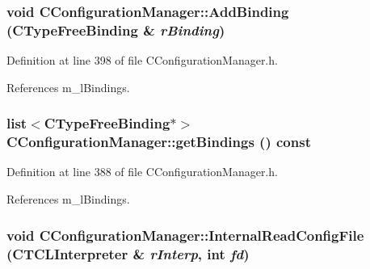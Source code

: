 \subsubsection{\setlength{\rightskip}{0pt plus 5cm}void CConfiguration\-Manager::Add\-Binding ({\bf CType\-Free\-Binding} \& {\em r\-Binding})\hspace{0.3cm}{\tt  [inline]}}\label{classCConfigurationManager_a9}




Definition at line 398 of file CConfiguration\-Manager.h.

References m\_\-l\-Bindings.
\subsubsection{\setlength{\rightskip}{0pt plus 5cm}list$<${\bf CType\-Free\-Binding}$\ast$$>$ CConfiguration\-Manager::get\-Bindings () const\hspace{0.3cm}{\tt  [inline]}}\label{classCConfigurationManager_a7}




Definition at line 388 of file CConfiguration\-Manager.h.

References m\_\-l\-Bindings.
\subsubsection{\setlength{\rightskip}{0pt plus 5cm}void CConfiguration\-Manager::Internal\-Read\-Config\-File ({\bf CTCLInterpreter} \& {\em r\-Interp}, int {\em fd})\hspace{0.3cm}{\tt  [protected]}}\label{classCConfigurationManager_b0}


